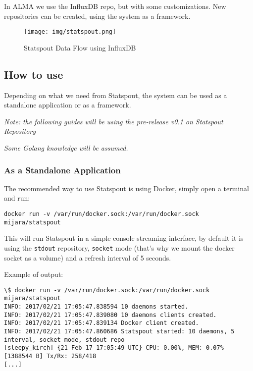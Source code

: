In ALMA we use the InfluxDB repo, but with some customizations. New repositories can be created, using the system as a framework.

\begin{figure}
    \centering
    \texttt{[image: img/statspout.png]}
    \caption{Statspout Data Flow using InfluxDB}
    \label{fig:statspout-flow}
\end{figure}

\subsection{How to use}

Depending on what we need from Statspout, the system can be used as a standalone application or as a framework.

\textit{Note: the following guides will be using the pre-release v0.1 on Statspout Repository \citep{statspout-github-0.1}}

\textit{Some Golang knowledge will be assumed. \citep{golang-website}}

\subsubsection{As a Standalone Application}

The recommended way to use Statspout is using Docker, simply open a terminal and run:

\begin{lstlisting}
docker run -v /var/run/docker.sock:/var/run/docker.sock mijara/statspout
\end{lstlisting}

This will run Statspout in a simple console streaming interface, by default it is using the \texttt{stdout} repository, \texttt{socket} mode (that's why we mount the docker socket as a volume) and a refresh interval of 5 seconds.

Example of output:

\begin{lstlisting}
\$ docker run -v /var/run/docker.sock:/var/run/docker.sock mijara/statspout
INFO: 2017/02/21 17:05:47.838594 10 daemons started.
INFO: 2017/02/21 17:05:47.839080 10 daemons clients created.
INFO: 2017/02/21 17:05:47.839134 Docker client created.
INFO: 2017/02/21 17:05:47.860686 Statspout started: 10 daemons, 5 interval, socket mode, stdout repo
[sleepy_kirch] {21 Feb 17 17:05:49 UTC} CPU: 0.00%, MEM: 0.07% [1388544 B] Tx/Rx: 258/418
[...]
\end{lstlisting}

